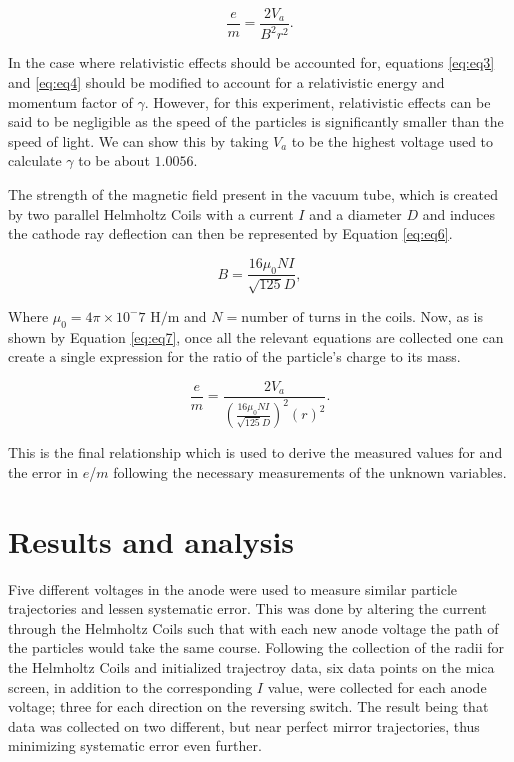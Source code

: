 \documentclass[prb,preprint]{revtex4-1}
\begin{document}
	\begin{equation}\label{eq:eq5}
		\frac{e}{m}=\frac{2V_a}{B^2r^2}.
	\end{equation}

In the case where relativistic effects should be accounted for, equations \eqref{eq:eq3} and \eqref{eq:eq4} should be modified to account for a relativistic energy and momentum factor of $\gamma$. However, for this experiment, relativistic effects can be said to be negligible as the speed of the particles is significantly smaller than the speed of light. We can show this by taking $V_a$ to be the highest voltage used to calculate $\gamma$ to be about $1.0056$.

The strength of the magnetic field present in the vacuum tube, which is created by two parallel Helmholtz Coils with a current $I$ and a diameter $D$ and induces the cathode ray deflection can then be represented by Equation \eqref{eq:eq6}.

	\begin{equation}\label{eq:eq6}
		B=\frac{16\mu_0 N I}{\sqrt{125}D},
	\end{equation}

Where $\mu_0=4\pi\times10^-7 \mbox{ H/m}$ and $N=\mbox{number of turns in the coils}$. Now, as is shown by Equation \eqref{eq:eq7}, once all the relevant equations are collected one can create a single expression for the ratio of the particle's charge to its mass.

	\begin{equation}\label{eq:eq7}
		\frac{e}{m}=\frac{2V_a}{\left(\frac{16\mu_0 N I}{\sqrt{125}D}\right)^2\left(r\right)^2}.
	\end{equation}

This is the final relationship which is used to derive the measured values for and the error in $e$/$m$ following the necessary measurements of the unknown variables.

\newpage

\section{Results and analysis}

Five different voltages in the anode were used to measure similar particle trajectories and lessen systematic error. This was done by altering the current through the Helmholtz Coils such that with each new anode voltage the path of the particles would take the same course. Following the collection of the radii for the Helmholtz Coils and initialized trajectroy data, six data points on the mica screen, in addition to the corresponding $I$ value, were collected for each anode voltage; three for each direction on the reversing switch. The result being that data was collected on two different, but near perfect mirror trajectories, thus minimizing systematic error even further. 
\end{document}
